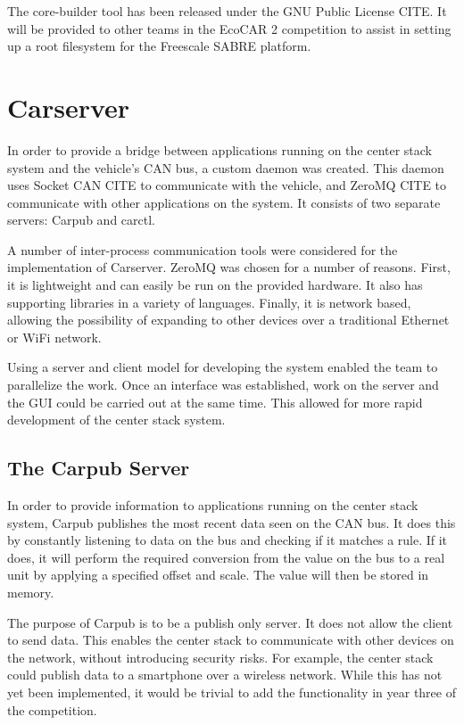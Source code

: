 \documentclass[ece]{uw-wkrpt}
\begin{document}
The core-builder tool has been released under the GNU Public License
CITE. It will be provided to other teams in the EcoCAR 2 competition to assist in
setting up a root filesystem for the Freescale SABRE platform.

\section{Carserver}

In order to provide a bridge between applications running on the center stack
system and the vehicle's CAN bus, a custom daemon was created. This daemon uses
Socket CAN CITE to communicate with the vehicle, and ZeroMQ CITE to communicate
with other applications on the system. It consists of two separate servers:
Carpub and carctl.

A number of inter-process communication tools were considered for the
implementation of Carserver. ZeroMQ was chosen for a number of reasons. First,
it is lightweight and can easily be run on the provided hardware. It also has
supporting libraries in a variety of languages. Finally, it is network based,
allowing the possibility of expanding to other devices over a traditional
Ethernet or WiFi network.

Using a server and client model for developing the system enabled the team to
parallelize the work. Once an interface was established, work on the server and
the GUI could be carried out at the same time. This allowed for more rapid
development of the center stack system.

\subsection{The Carpub Server}

In order to provide information to applications running on the center stack
system, Carpub publishes the most recent data seen on the CAN bus. It does this
by constantly listening to data on the bus and checking if it matches a rule. If
it does, it will perform the required conversion from the value on the bus to a
real unit by applying a specified offset and scale. The value will then be
stored in memory.

The purpose of Carpub is to be a publish only server. It does not allow the
client to send data. This enables the center stack to communicate with other
devices on the network, without introducing security risks. For example, the
center stack could publish data to a smartphone over a wireless network. While
this has not yet been implemented, it would be trivial to add the functionality
in year three of the competition.
\end{document}
